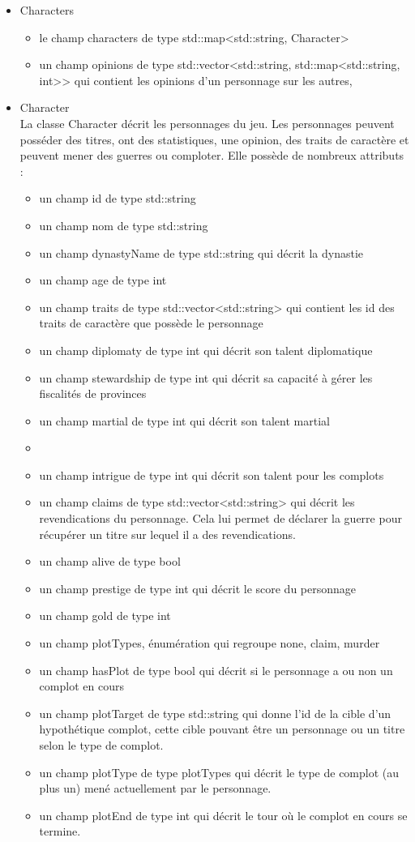 \documentclass[a4paper,12pt]{article}
\begin{document}
\begin{itemize}
\item Characters\\
\begin{itemize}
\item le champ characters de type std::map<std::string, Character>
\item un champ opinions de type std::vector<std::string, std::map<std::string, int>> qui contient les opinions d'un personnage sur les autres,
\end{itemize}
\item Character\\
La classe Character décrit les personnages du jeu. Les personnages peuvent posséder des titres, ont des statistiques, une opinion, des traits de caractère et peuvent mener des guerres ou comploter. Elle possède de nombreux attributs :
\begin{itemize}
\item un champ id de type std::string
\item un champ nom de type std::string
\item un champ dynastyName de type std::string qui décrit la dynastie
\item un champ age de type int
\item un champ traits de type std::vector<std::string> qui contient les id des traits de caractère que possède le personnage
\item un champ diplomaty de type int qui décrit son talent diplomatique
\item un champ stewardship de type int qui décrit sa capacité à gérer les fiscalités de provinces
\item un champ martial de type int qui décrit son talent martial
\item \item un champ intrigue de type int qui décrit son talent pour les complots
\item un champ claims de type std::vector<std::string> qui décrit les revendications du personnage. Cela lui permet de déclarer la guerre pour récupérer un titre sur lequel il a des revendications.
\item un champ alive de type bool
\item un champ prestige de type int qui décrit le score du personnage
\item un champ gold de type int
\item un champ plotTypes, énumération qui regroupe {none, claim, murder}
\item un champ hasPlot de type bool qui décrit si le personnage a ou non un complot en cours
\item un champ plotTarget de type std::string qui donne l'id de la cible d'un hypothétique complot, cette cible pouvant être un personnage ou un titre selon le type de complot.
\item un champ plotType de type plotTypes qui décrit le type de complot (au plus un) mené actuellement par le personnage.
\item un champ plotEnd de type int qui décrit le tour où le complot en cours se termine.
\end{itemize}


\end{itemize}
\end{document}
